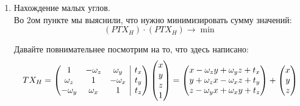 \documentclass[12pt]{article}
\newenvironment{MyList}[1][4pt]{
  \begin{enumerate}[1.]
  \setlength{\parskip}{0pt}
  \setlength{\itemsep}{#1}
}{       
  \end{enumerate}
}
\begin{document}
\begin{MyList}
		Запишем разложение $\sin$ и $\cos$ в ряд до $\mathcal{O}(x^2)$:
		$$\sin{x} = x + \mathcal{O}(x^2), \cos{x} = 1 + \mathcal{O}(x^2)$$
		
		Тогда при достаточно малых углах (до $\approx 20$ градусов) можно линеризовать матрицу поворота:
		$$ R = 
		\begin{pmatrix} 
		1 & -\omega_z & 0 \\
		\omega_z & 1 & 0 \\
		0 & 0 & 1
		\end{pmatrix}
		\begin{pmatrix} 
		1 & 0 & \omega_y \\
		0 & 1 & 0 \\
		-\omega_y & 0 & 1 
		\end{pmatrix}
		\begin{pmatrix} 
		1 & 0 & 0 \\
		0 & 1 & -\omega_x \\
		0 & \omega_x & 1
		\end{pmatrix} =
		\begin{pmatrix} 
		1 & -\omega_z & \omega_y \\
		\omega_z & 1 & -\omega_x \\
		-\omega_y & \omega_x & 1
		\end{pmatrix}$$
		
		Получается, что матрица трансформации будет иметь вид:
		$$ T = \left(\begin{array}{@{}ccc|c@{}}
		1 & -\omega_z & \omega_y & t_x \\
		\omega_z & 1 & -\omega_x & t_y \\
		-\omega_y & \omega_x & 1 & t_z
		\end{array}\right) $$
		
		\newpage
		\item{Нахождение малых углов.}\\
		Во $2$ом пункте мы выяснили, что нужно минимизировать сумму значений:
		$$(P T X_H) \cdot (P T X_H) \rightarrow \min$$
		
		Давайте повнимательнее посмотрим на то, что здесь написано:
		$$T X_H = 
		\left(\begin{array}{@{}ccc|c@{}}
		1 & -\omega_z & \omega_y & t_x \\
		\omega_z & 1 & -\omega_x & t_y \\
		-\omega_y & \omega_x & 1 & t_z
		\end{array}\right)
		\begin{pmatrix} 
		x \\
		y \\
		z \\
		1
		\end{pmatrix} =
		\begin{pmatrix} 
		x - \omega_z y + \omega_y z + t_x \\
		y + \omega_z x - \omega_x z + t_y \\
		z - \omega_y x + \omega_x y + t_z
		\end{pmatrix} +
		\begin{pmatrix} 
		x \\
		y \\
		z
		\end{pmatrix} 
		$$
		

\end{MyList}
\end{document}
